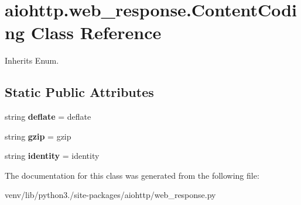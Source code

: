 \hypertarget{classaiohttp_1_1web__response_1_1_content_coding}{}\section{aiohttp.\+web\+\_\+response.\+Content\+Coding Class Reference}
\label{classaiohttp_1_1web__response_1_1_content_coding}


Inherits Enum.

\subsection*{Static Public Attributes}
\begin{DoxyCompactItemize}
\item 
\mbox{\label{classaiohttp_1_1web__response_1_1_content_coding_aca7dab9c0d89908d3581838f94074593}} 
string {\bfseries deflate} = \textquotesingle{}deflate\textquotesingle{}
\item 
\mbox{\label{classaiohttp_1_1web__response_1_1_content_coding_a83c6ab6bfd33da555bd9a892b43ec614}} 
string {\bfseries gzip} = \textquotesingle{}gzip\textquotesingle{}
\item 
\mbox{\label{classaiohttp_1_1web__response_1_1_content_coding_a322ccae663e5f71dd821326c6050c715}} 
string {\bfseries identity} = \textquotesingle{}identity\textquotesingle{}
\end{DoxyCompactItemize}


The documentation for this class was generated from the following file\+:\begin{DoxyCompactItemize}
\item 
venv/lib/python3./site-\/packages/aiohttp/web\+\_\+response.\+py\end{DoxyCompactItemize}
